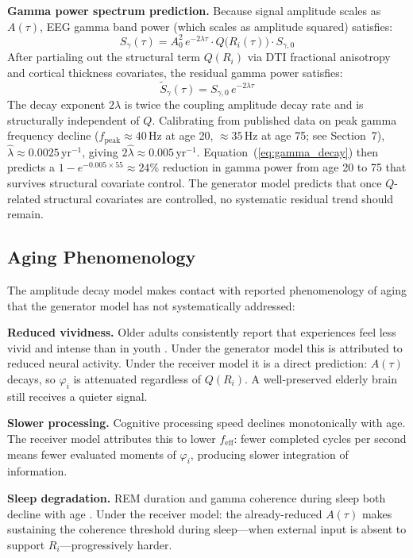 \documentclass[12pt]{article}
\begin{document}
\textbf{Gamma power spectrum prediction.} Because signal amplitude scales as $A(\tau)$, EEG gamma band power (which scales as amplitude squared) satisfies:
\begin{equation}
    S_\gamma(\tau) = A_0^2\, e^{-2\lambda\tau}\cdot Q\bigl(R_i(\tau)\bigr)\cdot S_{\gamma,0}
\end{equation}
After partialing out the structural term $Q(R_i)$ via DTI fractional anisotropy and cortical thickness covariates, the residual gamma power satisfies:
\begin{equation}\label{eq:gamma_decay}
    \tilde{S}_\gamma(\tau) = S_{\gamma,0}\, e^{-2\lambda\tau}
\end{equation}
The decay exponent $2\lambda$ is twice the coupling amplitude decay rate and is structurally independent of $Q$. Calibrating from published data on peak gamma frequency decline ($f_{\mathrm{peak}}\approx 40$\,Hz at age 20, $\approx 35$\,Hz at age 75; see Section~7), $\hat{\lambda}\approx 0.0025\,\mathrm{yr}^{-1}$, giving $2\hat{\lambda}\approx 0.005\,\mathrm{yr}^{-1}$. Equation~(\ref{eq:gamma_decay}) then predicts a $1 - e^{-0.005\times 55}\approx 24\%$ reduction in gamma power from age 20 to 75 that survives structural covariate control. The generator model predicts that once $Q$-related structural covariates are controlled, no systematic residual trend should remain.

\subsection{Aging Phenomenology}

The amplitude decay model makes contact with reported phenomenology of aging that the generator model has not systematically addressed:

\textbf{Reduced vividness.} Older adults consistently report that experiences feel less vivid and intense than in youth \cite{mather2012}. Under the generator model this is attributed to reduced neural activity. Under the receiver model it is a direct prediction: $A(\tau)$ decays, so $\varphi_i$ is attenuated regardless of $Q(R_i)$. A well-preserved elderly brain still receives a quieter signal.

\textbf{Slower processing.} Cognitive processing speed declines monotonically with age. The receiver model attributes this to lower $f_{\mathrm{eff}}$: fewer completed cycles per second means fewer evaluated moments of $\varphi_i$, producing slower integration of information.

\textbf{Sleep degradation.} REM duration and gamma coherence during sleep both decline with age \cite{mander2017}. Under the receiver model: the already-reduced $A(\tau)$ makes sustaining the coherence threshold during sleep---when external input is absent to support $R_i$---progressively harder.
\end{document}
